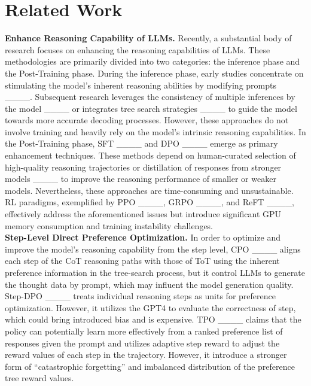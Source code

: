 \section{Related Work}
\textbf{Enhance Reasoning Capability of LLMs.}
Recently, a substantial body of research focuses on enhancing the reasoning capabilities of LLMs. These methodologies are primarily divided into two categories: the inference phase and the Post-Training phase. During the inference phase, early studies concentrate on stimulating the model's inherent reasoning abilities by modifying prompts ____. Subsequent research leverages the consistency of multiple inferences by the model ____ or integrates tree search strategies ____ to guide the model towards more accurate decoding processes. However, these approaches do not involve training and heavily rely on the model's intrinsic reasoning capabilities. In the Post-Training phase, SFT ____ and DPO ____ emerge as primary enhancement techniques. These methods depend on human-curated selection of high-quality reasoning trajectories or distillation of responses from stronger models ____ to improve the reasoning performance of smaller or weaker models. Nevertheless, these approaches are time-consuming and unsustainable. RL paradigms, exemplified by PPO ____, GRPO ____, and ReFT ____, effectively address the aforementioned issues but introduce significant GPU memory consumption and training instability challenges. 
\\\textbf{Step-Level Direct Preference Optimization.}
In order to optimize and improve the model's reasoning capability from the step level, CPO ____ aligns each step of the CoT reasoning paths with those of ToT using the inherent preference information in the tree-search process, but it control LLMs to generate the thought data by prompt, which may influent the model generation quality. Step-DPO ____ treats individual reasoning steps as units for preference optimization. However, it utilizes the GPT4 to evaluate the correctness of step, which could bring introduced bias and is expensive.  TPO ____ claims that the policy can potentially learn more effectively from a ranked preference list of responses given the prompt and utilizes adaptive step reward to adjust the reward values of each step in the trajectory.  However, it introduce a stronger form of ``catastrophic forgetting'' and imbalanced distribution of the preference tree reward values.

